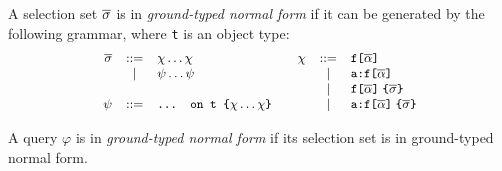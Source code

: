 \begin{definition}
A \gql selection set $\overline{\sigma}$ is in \textit{ground-typed normal form}
if it can be generated by the following grammar, where \texttt{t} is an object type: %
\begin{displaymath}\small
	\begin{array}{rcl@{\qquad}rcl}
	\sset & ::= & \chi \ldots \chi & \chi & ::= & \fld \\
	& | & \psi \ldots \psi & & | & \afld\\
	& & & & | & \nfld{\sset}\\
	\psi & ::= & \ifrag{t}{\chi \ldots \chi} & & | & \anfld{\sset}	
	\end{array}
\end{displaymath}

\noindent A \gql query $\varphi$ is in \textit{ground-typed normal form} if its selection set is in ground-typed normal form.

	\end{definition}
\iffalse
\begin{itemize}
	\item If it is a field then its subselections are either all fields or all inline fragments
	\item If it is an inline fragment, then its type condition is an object type and its subselections are only fields, and
	\item Its subselections are in ground-typed normal form.
\end{itemize}
\end{definition}
\fi


